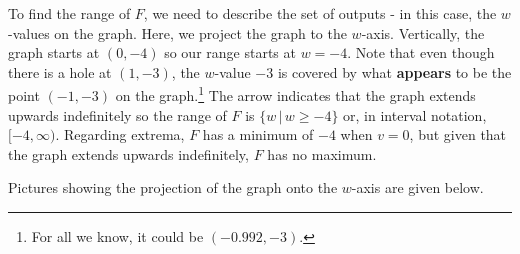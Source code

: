 \documentclass{ximera}
\begin{document}
\begin{example}
\begin{enumerate}
\begin{enumerate}
  



To find the range of $F$, we need to describe the set of outputs - in this case, the $w$-values on the graph.  Here, we project the graph to the $w$-axis.  Vertically, the graph starts at $(0,-4)$ so our range starts at $w=-4$.  Note that even  though there is a hole at $(1,-3)$, the $w$-value $-3$ is covered by what \textbf{appears} to be the point $(-1,-3)$ on the graph.\footnote{For all we know, it could be $(-0.992, -3)$.} The arrow indicates that the graph extends upwards indefinitely so the range of $F$ is   $\{ w \, |  \, w \geq -4 \}$  or, in interval notation, $[-4, \infty)$.   Regarding extrema, $F$ has a minimum of $-4$ when $v = 0$, but given that the graph extends upwards indefinitely, $F$ has  no maximum. 

 

Pictures showing the projection of the graph onto the $w$-axis are given below.

 





\end{enumerate}
\end{enumerate}
\end{example}
\end{document}
